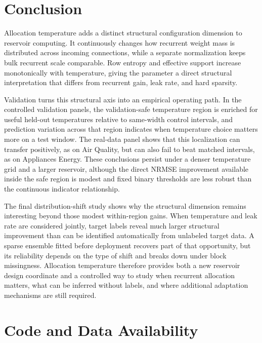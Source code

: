 \documentclass[11pt,a4paper]{article}
\begin{document}
\section{Conclusion}
\label{sec:conclusion}

Allocation temperature adds a distinct structural configuration dimension to reservoir computing. It continuously changes how recurrent weight mass is distributed across incoming connections, while a separate normalization keeps bulk recurrent scale comparable. Row entropy and effective support increase monotonically with temperature, giving the parameter a direct structural interpretation that differs from recurrent gain, leak rate, and hard sparsity.

Validation turns this structural axis into an empirical operating path. In the controlled validation panels, the validation-safe temperature region is enriched for useful held-out temperatures relative to same-width control intervals, and prediction variation across that region indicates when temperature choice matters more on a test window. The real-data panel shows that this localization can transfer positively, as on Air Quality, but can also fail to beat matched intervals, as on Appliances Energy. These conclusions persist under a denser temperature grid and a larger reservoir, although the direct NRMSE improvement available inside the safe region is modest and fixed binary thresholds are less robust than the continuous indicator relationship.

The final distribution-shift study shows why the structural dimension remains interesting beyond those modest within-region gains. When temperature and leak rate are considered jointly, target labels reveal much larger structural improvement than can be identified automatically from unlabeled target data. A sparse ensemble fitted before deployment recovers part of that opportunity, but its reliability depends on the type of shift and breaks down under block missingness. Allocation temperature therefore provides both a new reservoir design coordinate and a controlled way to study when recurrent allocation matters, what can be inferred without labels, and where additional adaptation mechanisms are still required.

\section*{Code and Data Availability}
\end{document}
